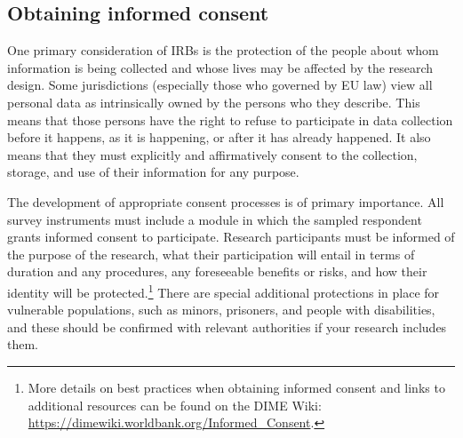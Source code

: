 \documentclass[
]{book}
\begin{document}
\hypertarget{obtaining-informed-consent}{%
\subsection*{Obtaining informed consent}\label{obtaining-informed-consent}}

One primary consideration of IRBs
is the protection of the people about whom information is being collected
and whose lives may be affected by the research design.
Some jurisdictions (especially those who governed by EU law) view all personal data
as intrinsically owned by the persons who they describe.
This means that those persons have the right to refuse to participate in data collection
before it happens, as it is happening, or after it has already happened.
It also means that they must explicitly and affirmatively consent
to the collection, storage, and use of their information for any purpose.

The development of appropriate consent processes is of primary importance.
All survey instruments must include a module in which the sampled respondent grants informed consent to participate.
Research participants must be informed of the purpose of the research,
what their participation will entail in terms of duration and any procedures,
any foreseeable benefits or risks,
and how their identity will be protected.\footnote{More details on best practices when obtaining informed consent
  and links to additional resources
  can be found on the DIME Wiki:
  \url{https://dimewiki.worldbank.org/Informed_Consent}.}
There are special additional protections in place for vulnerable populations,
such as minors, prisoners, and people with disabilities,
and these should be confirmed with relevant authorities if your research includes them.
\end{document}
